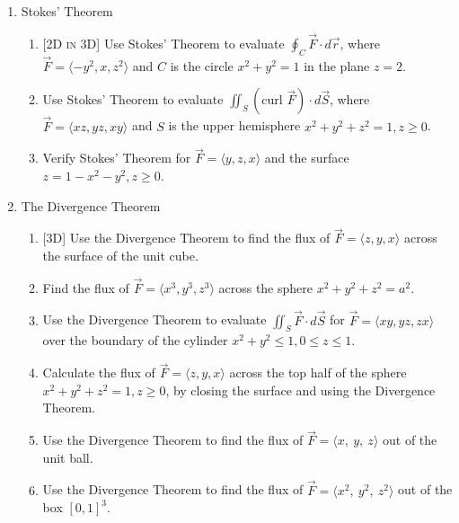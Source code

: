 \documentclass[12pt]{article}
\newcommand{\dimtag}[1]{{\footnotesize\textsc{[#1]}}\;}
\newcounter{topic}
\begin{document}
\begin{enumerate}
\item Stokes' Theorem
    \begin{enumerate}
        \item \dimtag{2D in 3D} Use Stokes' Theorem to evaluate $\oint_C \vec{F} \cdot d\vec{r}$, where $\vec{F} = \langle -y^2, x, z^2 \rangle$ and $C$ is the circle $x^2+y^2=1$ in the plane $z=2$.
        \item Use Stokes' Theorem to evaluate $\iint_S (\text{curl } \vec{F}) \cdot d\vec{S}$, where $\vec{F} = \langle xz, yz, xy \rangle$ and $S$ is the upper hemisphere $x^2+y^2+z^2=1, z \ge 0$.
        \item Verify Stokes' Theorem for $\vec{F} = \langle y, z, x \rangle$ and the surface $z = 1 - x^2 - y^2, z \ge 0$.
    \end{enumerate}
\bigskip

\item The Divergence Theorem
    \begin{enumerate}
        \item \dimtag{3D} Use the Divergence Theorem to find the flux of $\vec{F} = \langle z, y, x \rangle$ across the surface of the unit cube.
        \item Find the flux of $\vec{F} = \langle x^3, y^3, z^3 \rangle$ across the sphere $x^2+y^2+z^2 = a^2$.
        \item Use the Divergence Theorem to evaluate $\iint_S \vec{F} \cdot d\vec{S}$ for $\vec{F} = \langle xy, yz, zx \rangle$ over the boundary of the cylinder $x^2+y^2 \le 1, 0 \le z \le 1$.
        \item Calculate the flux of $\vec{F} = \langle z, y, x \rangle$ across the top half of the sphere $x^2 + y^2 + z^2 = 1, z \ge 0$, by closing the surface and using the Divergence Theorem.
        \item Use the Divergence Theorem to find the flux of $\vec F=\langle x,\ y,\ z\rangle$ out of the unit ball.
        \item Use the Divergence Theorem to find the flux of $\vec F=\langle x^2,\ y^2,\ z^2\rangle$ out of the box $[0,1]^3$.
    \end{enumerate}
\newpage
\setcounter{topic}{\value{enumi}}
\end{enumerate}
\end{document}
